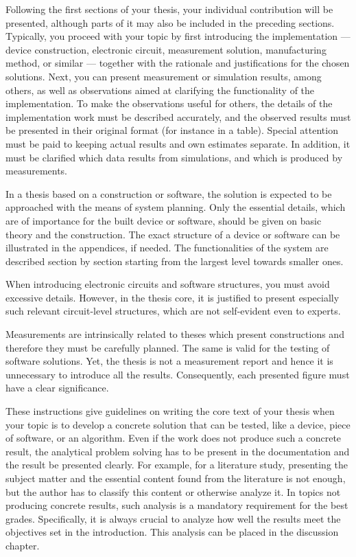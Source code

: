 Following the first sections of your thesis, your individual contribution will be presented, although parts of it may also be included in the preceding sections. Typically, you proceed with your topic by first introducing the implementation — device construction, electronic circuit, measurement solution, manufacturing method, or similar — together with the rationale and justifications for the chosen solutions. Next, you can present measurement or simulation results, among others, as well as observations aimed at clarifying the functionality of the implementation. To make the observations useful for others, the details of the implementation work must be described accurately, and the observed results must be presented in their original format (for instance in a table). Special attention must be paid to keeping actual results and own estimates separate. In addition, it must be clarified which data results from simulations, and which is produced by measurements.

In a thesis based on a construction or software, the solution is expected to be approached with the means of system planning. Only the essential details, which are of importance for the built device or software, should be given on basic theory and the construction. The exact structure of a device or software can be illustrated in the appendices, if needed. The functionalities of the system are described section by section starting from the largest level towards smaller ones.

When introducing electronic circuits and software structures, you must avoid excessive details. However, in the thesis core, it is justified to present especially such relevant circuit-level structures, which are not self-evident even to experts.

Measurements are intrinsically related to theses which present constructions and therefore they must be carefully planned. The same is valid for the testing of software solutions. Yet, the thesis is not a measurement report and hence it is unnecessary to introduce all the results. Consequently, each presented figure must have a clear significance.

These instructions give guidelines on writing the core text of your thesis when your topic is to develop a concrete solution that can be tested, like a device, piece of software, or an algorithm. Even if the work does not produce such a concrete result, the analytical problem solving has to be present in the documentation and the result be presented clearly. For example, for a literature study, presenting the subject matter and the essential content found from the literature is not enough, but the author has to classify this content or otherwise analyze it. In topics not producing concrete results, such analysis is a mandatory requirement for the best grades. Specifically, it is always crucial to analyze how well the results meet the objectives set in the introduction. This analysis can be placed in the discussion chapter.

